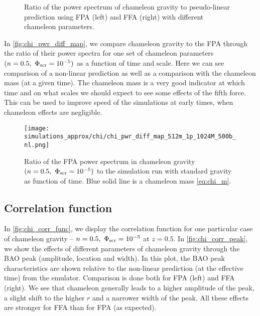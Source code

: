 \begin{figure*}
  \centering
	\begin{subfigure}{0.5\textwidth}
	\end{subfigure}
	\begin{subfigure}{0.5\textwidth}
	\end{subfigure}%
	\begin{subfigure}{0.5\textwidth}
	\end{subfigure}
  \caption{Ratio of the power spectrum of chameleon gravity to pseudo-linear prediction using FPA (left) and FFA (right) with different chameleon parameters.}
  \label{fig:CHI_FP_diff_lin_ratio}
\end{figure*}

In \autoref{fig:chi_pwr_diff_map}, we compare chameleon gravity to the FPA through the ratio of their power spectra for one set of chameleon parameters $(n=0.5,\ \Phi_{\text{\scriptsize scr}}=10^{-5})$ as a function of time and scale. Here we can see comparison of a non-linear prediction as well as a comparison with the chameleon mass (at a given time). The chameleon mass is a very good indicator at which time and on what scales we should expect to see some effects of the fifth force. This can be used to improve speed of the simulations at early times, when chameleon effects are negligible.
\begin{figure}
	\centering
	\texttt{[image: simulations\_approx/chi/chi\_pwr\_diff\_map\_512m\_1p\_1024M\_500b\_nl.png]}
	\caption{Ratio of the FPA power spectrum in chameleon gravity $(n=0.5,\ \Phi_{\text{\scriptsize scr}}=10^{-5})$ to the simulation run with standard gravity as function of time. Blue solid line is a chameleon mass \eqref{eq:chi_m}.}
	\label{fig:chi_pwr_diff_map}
\end{figure}

\subsection{Correlation function}
In \autoref{fig:chi_corr_func}, we display the correlation function for one particular case of chameleon gravity -- $n=0.5,\ \Phi_{\text{\scriptsize scr}}=10^{-5}$ at $z=0.5$. In \autoref{fig:chi_corr_peak}, we show the effects of different parameters of chameleon gravity through the BAO peak (amplitude, location and width). In this plot, the BAO peak characteristics are shown relative to the non-linear prediction (at the effective time) from the emulator. Comparison is done both for FPA (left) and FFA (right). We see that chameleon generally leads to a higher amplitude of the peak, a slight shift to the higher $r$ and a narrower width of the peak. All these effects are stronger for FFA than for FPA (as expected).

